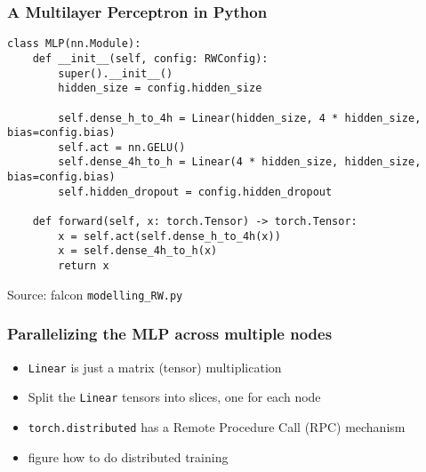 \documentclass{beamer}
\begin{document}
\begin{frame}[fragile]
\frametitle{A Multilayer Perceptron in Python}
{\tiny\begin{verbatim}
class MLP(nn.Module):
    def __init__(self, config: RWConfig):
        super().__init__()
        hidden_size = config.hidden_size

        self.dense_h_to_4h = Linear(hidden_size, 4 * hidden_size, bias=config.bias)
        self.act = nn.GELU()
        self.dense_4h_to_h = Linear(4 * hidden_size, hidden_size, bias=config.bias)
        self.hidden_dropout = config.hidden_dropout

    def forward(self, x: torch.Tensor) -> torch.Tensor:
        x = self.act(self.dense_h_to_4h(x))
        x = self.dense_4h_to_h(x)
        return x
\end{verbatim}}
Source: falcon {\tt modelling_RW.py}
\end{frame}

\begin{frame}
\frametitle{Parallelizing the MLP across multiple nodes}

\begin{itemize}
\item {\tt Linear} is just a matrix (tensor) multiplication
\item Split the {\tt Linear} tensors into slices, one for each node
\item {\tt torch.distributed} has a Remote Procedure Call (RPC) mechanism
\item figure how to do distributed training
\end{itemize}
\end{frame}
\end{document}
